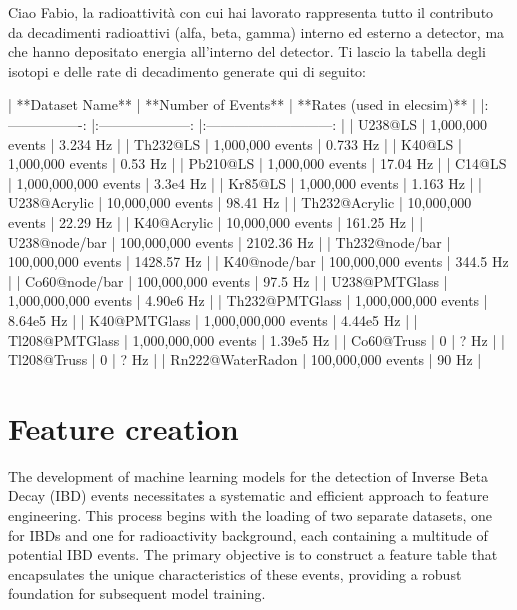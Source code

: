 


Ciao Fabio, la radioattività con cui hai lavorato rappresenta tutto il contributo da decadimenti radioattivi (alfa, beta, gamma) interno ed esterno a detector, ma che hanno depositato energia all'interno del detector.
Ti lascio la tabella degli isotopi e delle rate di decadimento generate qui di seguito:


| **Dataset Name**  | **Number of Events**  | **Rates (used in elecsim)**  |
|:----------------: |:--------------------: |:---------------------------: |
|      U238@LS      |   1,000,000 events    |           3.234 Hz           |
|     Th232@LS      |   1,000,000 events    |           0.733 Hz           |
|      K40@LS       |   1,000,000 events    |           0.53 Hz            |
|     Pb210@LS      |   1,000,000 events    |           17.04 Hz           |
|      C14@LS       | 1,000,000,000 events  |           3.3e4 Hz           |
|      Kr85@LS      |   1,000,000 events    |           1.163 Hz           |
|   U238@Acrylic    |   10,000,000 events   |           98.41 Hz           |
|   Th232@Acrylic   |   10,000,000 events   |           22.29 Hz           |
|    K40@Acrylic    |   10,000,000 events   |          161.25 Hz           |
|   U238@node/bar   |  100,000,000 events   |          2102.36 Hz          |
|  Th232@node/bar   |  100,000,000 events   |          1428.57 Hz          |
|   K40@node/bar    |  100,000,000 events   |           344.5 Hz           |
|   Co60@node/bar   |  100,000,000 events   |           97.5 Hz            |
|   U238@PMTGlass   | 1,000,000,000 events  |          4.90e6 Hz           |
|  Th232@PMTGlass   | 1,000,000,000 events  |          8.64e5 Hz           |
|   K40@PMTGlass    | 1,000,000,000 events  |          4.44e5 Hz           |
|  Tl208@PMTGlass   | 1,000,000,000 events  |          1.39e5 Hz           |
|    Co60@Truss     |           0           |             ? Hz             |
|    Tl208@Truss    |           0           |             ? Hz             |
| Rn222@WaterRadon  |  100,000,000 events   |            90 Hz             |


\section{Feature creation}
The development of machine learning models for the detection of Inverse Beta Decay (IBD) events necessitates a systematic and efficient approach to feature engineering. This process begins with the loading of two separate datasets, one for IBDs and one for radioactivity background, each containing a multitude of potential IBD events. The primary objective is to construct a feature table that encapsulates the unique characteristics of these events, providing a robust foundation for subsequent model training.

